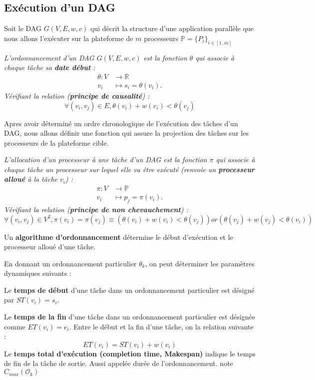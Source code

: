 \subsection{Exécution  d'un DAG}  %
%
Soit le DAG $G(V,E,w,c)$ qui décrit la structure d'une application parallèle que nous allons l'exécuter sur la plateforme de $m$ processeurs  $\mathbb{P} = \{P_i\}_{i \in [1..m]}$
%
\begin{définition}\textit{
%
L'ordonnancement d'un DAG $G(V,E,w,c)$ est la fonction $\theta$ qui associe à  chaque tâche sa \textbf{date début} : 
\begin{align*}
  \theta \colon V & \to \mathbb{R}\\
  v_i                    & \mapsto s_i = \theta(v_i).
\end{align*}
%
Vérifiant la relation (\textbf{principe de causalité}) :  
$$\forall (v_i, v_j) \in E, \theta(v_i) + w(v_i) < \theta(v_j)$$
%
}\end{définition}
%
Apres avoir déterminé un ordre chronologique de l'exécution des tâches d'un DAG, nous allons définir une fonction qui assure la projection des tâches sur les processeurs de la plateforme cible.
%
\begin{définition}\textit{
%
L'allocation d'un processeur à une tâche d'un DAG est la fonction $\pi$ qui associe à  chaque tâche un processeur sur lequel elle va être exécuté (renvoie un \textbf{processeur alloué} à la tâche $v_i$) : 
\begin{align*}
  \pi \colon V & \to \mathbb{P}\\
  v_i                    & \mapsto p_j = \pi(v_i).
\end{align*}
%
Vérifiant la relation (\textbf{principe de non chevauchement}) : 
$$\forall (v_i, v_j) \in V^2, \pi(v_i) = \pi(v_j) \equiv (\theta(v_i)+ w(v_i) < \theta(v_j)) or (\theta(v_j)+ w(v_j) < \theta(v_i))$$
%
}\end{définition}
%
Un \textbf{algorithme d'ordonnancement} détermine le début d'exécution et le processeur alloué d'une tâche. 

En donnant un ordonnancement particulier $\theta_k$, on peut déterminer les paramètres dynamiques suivants :

Le \textbf{temps de début} d'une tâche dans un ordonnancement particulier est désigné par $ ST(v_i) =  s_i $.

Le \textbf{temps de la fin} d'une tâche dans un ordonnancement particulier est désignée comme $ ET (v_i) = e_i $. 
Entre le début et la fin d'une tâche, on la relation suivante :  
%
$$
ET(v_i) = ST(v_i) + w(v_i)
$$
%
Le \textbf{temps total d'exécution (completion time, Makespan)} indique le temps de fin de la tâche de sortie. Aussi appelée durée de l'ordonnancement. note $C_{max}(\mathcal{O}_k)$

